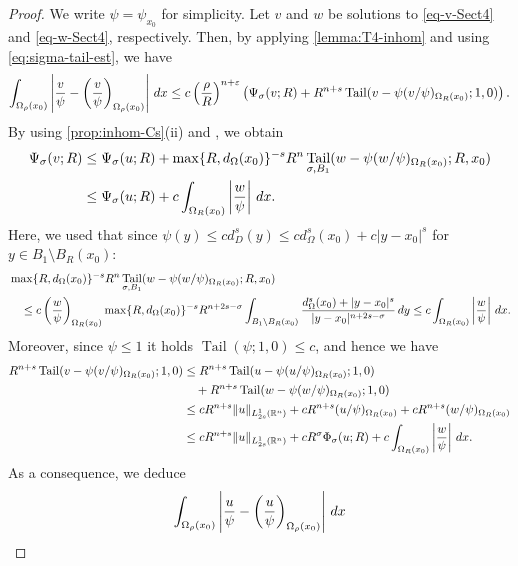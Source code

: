 \documentclass[11pt,reqno]{amsart}
\theoremstyle{plain}
\theoremstyle{definition}
\numberwithin{equation}{section}
\newcommand{\R}{\mathbb{R}}
\newcommand{\1}{\mathbbm{1}}
\DeclareMathOperator{\tail}{Tail}
\renewcommand{\d}{\textnormal{\,d}}
\begin{document}
\begin{proof}
We write $\psi=\psi_{x_0}$ for simplicity.
Let $v$ and $w$ be solutions to \eqref{eq-v-Sect4} and \eqref{eq-w-Sect4}, respectively. Then, by applying \autoref{lemma:T4-inhom} and using \eqref{eq:sigma-tail-est}, we have
\begin{align*}
    \int_{\Omega_{\rho}(x_0)} \left|\frac{v}{\psi} - \left( \frac{v}{\psi} \right)_{\Omega_{\rho}(x_0)} \right| \d x
    \leq c \left( \frac{\rho}{R} \right)^{n+\varepsilon} \left( \Psi_\sigma(v;R) + R^{n+s} \tail(v-\psi(v/\psi)_{\Omega_{R}(x_0)}; 1,0) \right).
\end{align*}
By using \autoref{prop:inhom-Cs}(ii) and \cite[Lemma~B.2.4]{FeRo24}, we obtain
\begin{align*}
    \Psi_{\sigma}(v; R)
    &\leq \Psi_{\sigma}(u; R) + \max\{R, d_\Omega(x_0)\}^{-s} R^n \tail_{\sigma, B_1}(w-\psi(w/\psi)_{\Omega_R(x_0)}; R, x_0) \\
    &\leq \Psi_{\sigma}(u; R) + c \int_{\Omega_R(x_0)} \left| \frac{w}{\psi} \right| \d x.
\end{align*}
Here, we used that since $\psi(y) \le c d_{D}^s(y) \le c d_{\Omega}^s(x_0) + c |y - x_0|^s$ for $y \in B_1 \setminus B_R(x_0)$:
\begin{align*}
    &\max\{R, d_\Omega(x_0)\}^{-s} R^n \tail_{\sigma, B_1}(w-\psi(w/\psi)_{\Omega_R(x_0)}; R, x_0) \\
    &\quad\le c\left( \frac{w}{\psi} \right)_{\Omega_R(x_0)}  \max\{R , d_{\Omega}(x_0) \}^{-s} R^{n+2s-\sigma} \int_{B_1 \setminus B_R(x_0)} \frac{d_{\Omega}^s(x_0) + |y - x_0|^s}{|y-x_0|^{n+2s-\sigma}} \d y \le c \int_{\Omega_R(x_0)} \left| \frac{w}{\psi} \right| \d x.
\end{align*}
Moreover, since $\psi \le 1$ it holds $\tail(\psi;1,0) \le c$, and hence we have
\begin{align*}
    R^{n+s}\tail(v-\psi(v/\psi)_{\Omega_{R}(x_0)}; 1,0)
    &\leq R^{n+s} \tail(u-\psi(u/\psi)_{\Omega_{R}(x_0)}; 1,0) \\
    &\quad + R^{n+s}\tail(w-\psi(w/\psi)_{\Omega_{R}(x_0)}; 1,0) \\
    &\leq cR^{n+s}\|u\|_{L^1_{2s}(\R^n)} + cR^{n+s}(u/\psi)_{\Omega_{R}(x_0)} + cR^{n+s}(w/\psi)_{\Omega_{R}(x_0)} \\
    &\leq cR^{n+s}\|u\|_{L^1_{2s}(\R^n)} + cR^{\sigma} \Phi_{\sigma}(u;R) + c\int_{\Omega_R(x_0)} \left| \frac{w}{\psi} \right| \d x.
\end{align*}
As a consequence, we deduce
\begin{align*}
\int_{\Omega_{\rho}(x_0)} &\left|\frac{u}{\psi} - \left( \frac{u}{\psi} \right)_{\Omega_{\rho}(x_0)} \right| \d x \\

\end{align*}
\end{proof}
\end{document}
